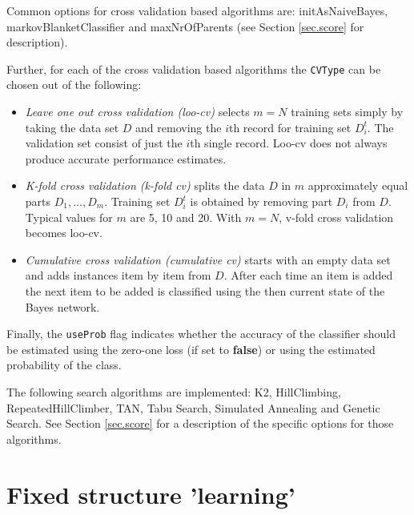 \documentclass{article}
\begin{document}
\begin{center}
\end{center}

Common options for cross validation based algorithms are:
{\sf initAsNaiveBayes}, {\sf markovBlanketClassifier} and {\sf maxNrOfParents}
(see Section \ref{sec.score} for description).

Further, for each of the cross validation based algorithms the {\tt CVType} can be
chosen out of the following:

\begin{itemize}
\item {\em Leave one out cross validation (loo-cv)} selects $m=N$ training sets 
simply by taking the data set $D$ and removing the $i$th record for training 
set $D_i^t$. The validation set consist of just the $i$th single record. 
Loo-cv does not always produce accurate performance estimates. 

\item {\em K-fold cross validation (k-fold cv)} splits the data $D$ in $m$ approximately 
equal parts $D_1,\ldots,D_m$. Training set $D_i^t$ is obtained by removing part 
$D_i$ from $D$. Typical values for $m$ are 5, 10 and 20. With $m=N$, v-fold cross
validation becomes loo-cv. 

\item {\em Cumulative cross validation (cumulative cv)} starts with an empty data
set and adds instances item by item from $D$. After each time an item is added
the next item to be added is classified using the then current state of the
Bayes network.
\end{itemize}

Finally, the {\tt useProb} flag indicates whether the accuracy of the classifier
should be estimated using the zero-one loss (if set to {\bf false}) or using
the estimated probability of the class.

\begin{center}
\end{center}

The following search algorithms are implemented: K2, HillClimbing, RepeatedHillClimber,
TAN, Tabu Search, Simulated Annealing and Genetic Search. See Section \ref{sec.score} for
a description of the specific options for those algorithms.

\section{Fixed structure 'learning'}
\end{document}
